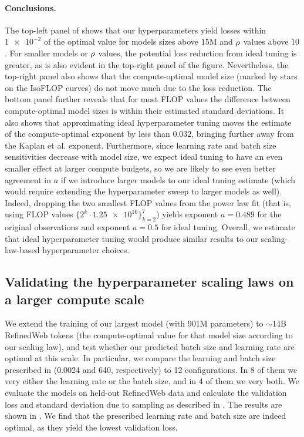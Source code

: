 \documentclass{article}
\makeatletter
\theoremstyle{plain}
\theoremstyle{definition}
\theoremstyle{remark}
\newcommand{\maybeSubscript}[1]{
  \ifthenelse{\equal{#1}{}}{}{_{#1}}%
}
\newcommand{\Kaplan}{Kaplan et al.\@\xspace}
\newcommand{\ratio}[1][]{\rho\maybeSubscript{#1}}
\newcommand{\nExp}{a}
\makeatother
\begin{document}
\paragraph{Conclusions.} 
The top-left panel of  shows that our hyperparameters yield losses within $\num{1e-2}$ of the optimal value for models sizes above $15$M and $\ratio$ values above $10$. For smaller models or $\ratio$ values, the potential loss reduction from ideal tuning is greater, as is also evident in the top-right panel of the figure. Nevertheless, the top-right panel also shows that the compute-optimal model size (marked by stars on the IsoFLOP curves) do not move much due to the loss reduction. The bottom panel further reveals that for most FLOP values the difference between compute-optimal model sizes is within their estimated standard deviations. It also shows that approximating ideal hyperparameter tuning moves the estimate of the compute-optimal exponent by less than $0.032$, bringing further away from the \Kaplan exponent. 
Furthermore, since learning rate and batch size sensitivities decrease with model size, we expect ideal tuning to have an even smaller effect at larger compute budgets, so we are likely to see even better agreement in $\nExp$ if we introduce larger models to our ideal tuning estimate (which would require extending the hyperparameter sweep to larger models as well). 
Indeed, dropping the two smallest FLOP values from the power law fit (that is, using FLOP values $\{2^{k} \cdot \num{1.25e16}\}_{k=2}^7$) yields exponent $\nExp=0.489$ for the original observations and exponent $\nExp = 0.5$ for ideal tuning.
Overall, we estimate that ideal hyperparameter tuning would produce similar results to our scaling-law-based hyperparameter choices.

\subsection{Validating the hyperparameter scaling laws on a larger compute scale}\label{app:larger-scale}

We extend the training of our largest model (with \num{901}M parameters) to $\sim$\num{14}B RefinedWeb tokens (the compute-optimal value for that model size according to our scaling law), and test whether our predicted batch size and learning rate are optimal at this scale. In particular, we compare the learning and batch size prescribed in  (\num{0.0024} and \num{640}, respectively) to 12 configurations. In 8 of them we very either the learning rate or the batch size, and in 4 of them we very both. We evaluate the models on held-out RefinedWeb data and calculate the validation loss and standard deviation due to sampling as described in . The results are shown in . We find that the prescribed learning rate and batch size are indeed optimal, as they yield the lowest validation loss.
\end{document}
